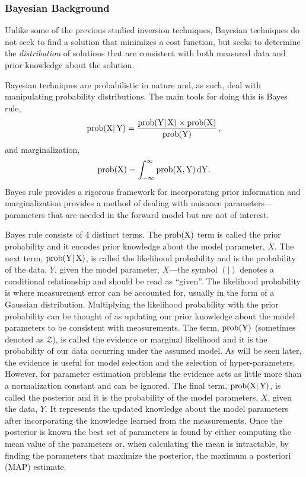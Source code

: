 \subsubsection{Bayesian Background}
Unlike some of the previous studied inversion techniques, Bayesian techniques do not seek to find a solution that minimizes a cost function, but seeks to determine the \textit{distribution} of solutions that are consistent with both measured data and prior knowledge about the solution.

Bayesian techniques are probabilistic in nature and, as such, deal with manipulating probability distributions. The main tools for doing this is Bayes rule,
\begin{equation}\label{eq:bayes_rule}
    \rm{prob}(X|\,Y) = \frac{\rm{prob}(Y|\,X) \times \rm{prob}(X)}{\rm{prob}(Y)}\,,
\end{equation}
and marginalization,
\begin{equation}\label{eq:marginalization}
    \rm{prob}(X) = \int_{-\infty}^{\infty} \rm{prob}(X,Y)\,dY .
\end{equation}
Bayes rule provides a rigorous framework for incorporating prior information and marginalization provides a method of dealing with nuisance parameters---parameters that are needed in the forward model but are not of interest.

Bayes rule consists of 4 distinct terms.
The $\rm{prob}(X)$ term is called the prior probability and it encodes prior knowledge about the model parameter, $X$.
The next term, $\rm{prob}(Y|\,X)$, is called the likelihood probability and is the probability of the data, $Y$, given the model parameter, $X$---the symbol $(|)$ denotes a conditional relationship and should be read as ``given''.
The likelihood probability is where measurement error can be accounted for, usually in the form of a Gaussian distribution.
Multiplying the likelihood probability with the prior probability can be thought of as updating our prior knowledge about the model parameters to be consistent with measurements.
The term, $\rm{prob}(Y)$ (sometimes denoted as $\mathcal{Z}$), is called the evidence or marginal likelihood and it is the probability of our data occurring under the assumed model.
As will be seen later, the evidence is useful for model selection and the selection of hyper-parameters. However, for parameter estimation problems the evidence acts as little more than a normalization constant and can be ignored. 
The final term, $\rm{prob}(X|\,Y)$, is called the posterior and it is the probability of the model parameters, $X$, given the data, $Y$. It represents the updated knowledge about the model parameters after incorporating the knowledge learned from the measurements.
Once the posterior is known the best set of parameters is found by either computing the mean value of the parameters or, when calculating the mean is intractable, by finding the parameters that maximize the posterior, the maximum a posteriori (MAP) estimate.

